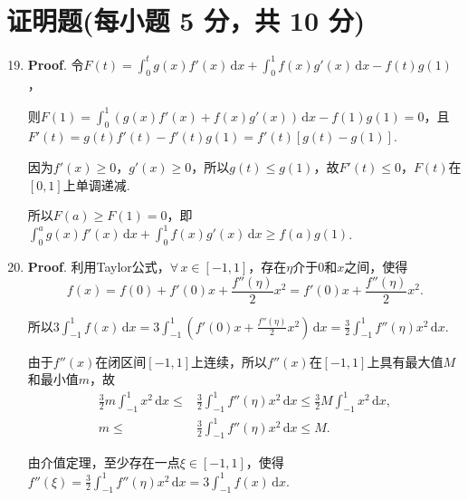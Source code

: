 \documentclass[../Main.tex]{subfiles}
\begin{document}
\section{证明题(每小题 5 分，共 10 分)}
\begin{enumerate}
    \setcounter{enumi}{18}
    \item \textbf{Proof}. 令$F(t)=\int_{0}^{t}g(x)f'(x)\,\mathrm{d}x+\int_{0}^{1}
              f(x)g'(x)\,\mathrm{d}x-f(t)g(1)$，

          则$F(1)=\int_{0}^{1}\left(g(x)f'(x)+f(x)g'(x)\right)\,\mathrm{d}x-f(1)g(1)=0$，且$F
              '(t)=g(t)f'(t)-f'(t)g(1)=f'(t)\left[g(t)-g(1)\right]$.

          因为$f'(x)\geq 0$，$g'(x)\geq 0$，所以$g(t)\leq g(1)$，故$F'(t)\leq 0$，$F(
              t)$在$[0,1]$上单调递减.

          所以$F(a)\geq F(1)=0$，即$\int_{0}^{a}g(x)f'(x)\,\mathrm{d}x+\int_{0}^{1}f(x)
              g'(x)\,\mathrm{d}x\geq f(a)g(1)$.

    \item \textbf{Proof}. 利用Taylor公式，$\forall\,x\in[-1,1]$，存在$\eta$介于$0$和$x$之间，使得
          \[
              f(x)=f(0)+f'(0)x+\frac{f''(\eta)}{2}x^{2}=f'(0)x+\frac{f''(\eta)}{2}x^{2}
              .
          \]

          所以$3\int_{-1}^{1}f(x)\,\mathrm{d}x=3\int_{-1}^{1}\left(f'(0)x+\frac{f''(\eta)}{2}
              x^{2}\right)\,\mathrm{d}x=\frac{3}{2}\int_{-1}^{1}f''(\eta)x^{2}\,\mathrm{d}x$.

          由于$f''(x)$在闭区间$[-1,1]$上连续，所以$f''(x)$在$[-1,1]$上具有最大值$M$和最小值$m$，故
          \[
              \begin{aligned}
                  \frac{3}{2}m\int_{-1}^{1}x^{2}\,\mathrm{d}x\leq & \frac{3}{2}\int_{-1}^{1}f''(\eta)x^{2}\,\mathrm{d}x\leq \frac{3}{2}M\int_{-1}^{1}x^{2}\,\mathrm{d}x, \\
                  m\leq                                           & \frac{3}{2}\int_{-1}^{1}f''(\eta)x^{2}\,\mathrm{d}x\leq M.
              \end{aligned}
          \]

          由介值定理，至少存在一点$\xi\in[-1,1]$，使得$f''(\xi)=\frac{3}{2}\int_{-1}^{1}
              f''(\eta)x^{2}\,\mathrm{d}x=3\int_{-1}^{1}f(x)\,\mathrm{d}x$.
\end{enumerate}
\end{document}
